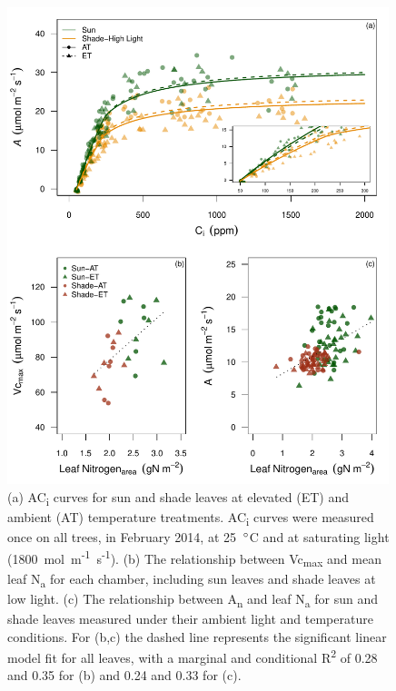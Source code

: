 \documentclass[a4paper]{article}\usepackage[]{graphicx}\usepackage[]{color}
\begin{document}
\begin{figure}[h!]
    \centering
    \includegraphics[width=0.99\textwidth]{aci_nitrovcmax.pdf}
    \caption{(a) AC\textsubscript{i} curves for sun and shade leaves at elevated (ET) and ambient (AT) temperature treatments. AC\textsubscript{i} curves were measured once on all trees, in February 2014, at 25~$\degree$C and at saturating light (1800~{\textmugreek}mol~m\textsuperscript{-1}~s\textsuperscript{-1}). (b) The relationship between Vc\textsubscript{max} and mean leaf N\textsubscript{a} for each chamber, including sun leaves and shade leaves at low light. (c) The relationship between A\textsubscript{n} and leaf N\textsubscript{a} for sun and shade leaves measured under their ambient light and temperature conditions. For (b,c) the dashed line represents the significant linear model fit for all leaves, with a marginal and conditional R\textsuperscript{2} of 0.28 and 0.35 for (b) and 0.24 and 0.33 for (c).}
    \label{fig:figure 3.2}
\end{figure}
\end{document}
